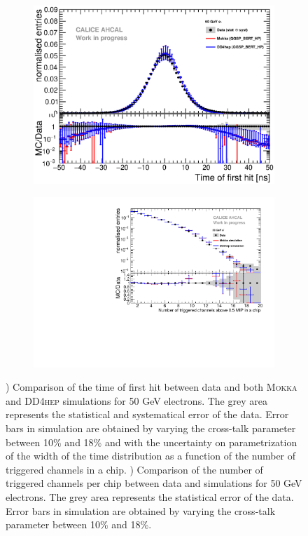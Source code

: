 \documentclass{JINST}
\newcommand\mokka{\textsc{Mokka}\xspace}
\newcommand\ddhep{\textsc{DD4hep}\xspace}
\begin{document}
\begin{figure}[htbp!]
  \centering
  \begin{subfigure}[t]{0.49\textwidth}
    \includegraphics[width=1\textwidth]{fig/Comparison_SimData_Electrons50GeV.eps}
    \caption{}\label{fig:elec_sim_data_50GeV}
  \end{subfigure}
  \hfill
  \begin{subfigure}[t]{0.49\textwidth}
    \includegraphics[width=1\textwidth]{fig/Comparison_SimData_Electrons_nHits_50GeV.pdf}
    \caption{}\label{fig:elec_sim_data_nHits_50GeV}
  \end{subfigure}
  \caption{) Comparison of the time of first hit between data and both \mokka and \ddhep simulations for 50 GeV electrons. The grey area represents the statistical and systematical error of the data. Error bars in simulation are obtained by varying the cross-talk parameter between 10\% and 18\% and with the uncertainty on parametrization of the width of the time distribution as a function of the number of triggered channels in a chip. ) Comparison of the number of triggered channels per chip between data and simulations for 50 GeV electrons. The grey area represents the statistical error of the data. Error bars in simulation are obtained by varying the cross-talk parameter between 10\% and 18\%.}
\end{figure}
\end{document}
